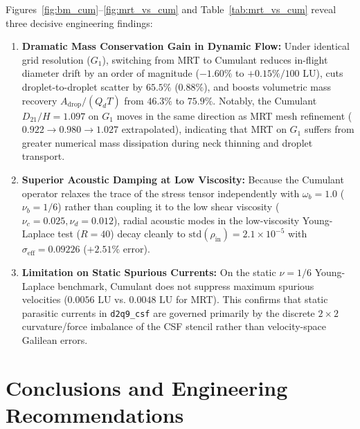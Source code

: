 \documentclass[11pt,a4paper]{article}
\begin{document}
Figures~\ref{fig:bm_cum}--\ref{fig:mrt_vs_cum} and Table~\ref{tab:mrt_vs_cum} reveal three decisive engineering findings:
\begin{enumerate}
    \item \textbf{Dramatic Mass Conservation Gain in Dynamic Flow:} Under identical grid resolution ($G_1$), switching from MRT to Cumulant reduces in-flight diameter drift by an order of magnitude ($-1.60\%$ to $+0.15\%/100\text{ LU}$), cuts droplet-to-droplet scatter by $65.5\%$ ($0.88\%$), and boosts volumetric mass recovery $A_{\mathrm{drop}} / (Q_d T)$ from $46.3\%$ to $75.9\%$. Notably, the Cumulant $D_{21}/H = 1.097$ on $G_1$ moves in the same direction as MRT mesh refinement ($0.922 \to 0.980 \to 1.027$ extrapolated), indicating that MRT on $G_1$ suffers from greater numerical mass dissipation during neck thinning and droplet transport.
    \item \textbf{Superior Acoustic Damping at Low Viscosity:} Because the Cumulant operator relaxes the trace of the stress tensor independently with $\omega_b = 1.0$ ($\nu_b = 1/6$) rather than coupling it to the low shear viscosity ($\nu_c = 0.025, \nu_d = 0.012$), radial acoustic modes in the low-viscosity Young-Laplace test ($R = 40$) decay cleanly to $\text{std}(\rho_{\mathrm{in}}) = 2.1 \times 10^{-5}$ with $\sigma_{\mathrm{eff}} = 0.09226$ ($+2.51\%$ error).
    \item \textbf{Limitation on Static Spurious Currents:} On the static $\nu = 1/6$ Young-Laplace benchmark, Cumulant does not suppress maximum spurious velocities ($0.0056\text{ LU}$ vs. $0.0048\text{ LU}$ for MRT). This confirms that static parasitic currents in \texttt{d2q9\_csf} are governed primarily by the discrete $2 \times 2$ curvature/force imbalance of the CSF stencil rather than velocity-space Galilean errors.
\end{enumerate}

\section{Conclusions and Engineering Recommendations}
\end{document}
